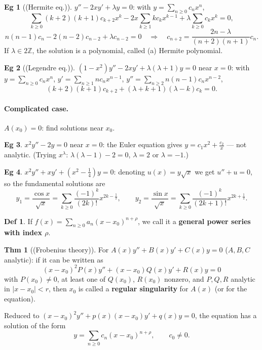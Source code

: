 \documentclass[11pt]{article}
\theoremstyle{definition}
\newtheorem*{definition}{Def}
\newtheorem*{theorem}{Thm}
\newtheorem*{example}{Eg}
\theoremstyle{remark}
\newcommand{\Z}{\mathbb{Z}}
\begin{document}
\begin{example}[(Hermite eq.)]
$y''-2xy'+\lambda y=0$: with $y=\sum_{n\ge0}c_nx^n$,
\[
\sum_{k\ge0}(k+2)(k+1)c_{k+2}x^k-2x\sum_{k\ge1}kc_kx^{k-1}+\lambda\sum_{k\ge0}c_kx^k=0,
\]
\[
n(n-1)c_n-2(n-2)c_{n-2}+\lambda c_{n-2}=0
\quad\Rightarrow\quad c_{n+2}=\frac{2n-\lambda}{(n+2)(n+1)}c_n.
\]
If $\lambda\in2\Z$, the solution is a polynomial, called (a) Hermite polynomial.
\end{example}

\begin{example}[(Legendre eq.)]
$(1-x^2)y''-2xy'+\lambda(\lambda+1)y=0$ near $x=0$: with
$y=\sum_{n\ge0}c_nx^n$, $y'=\sum_{n\ge1}nc_nx^{n-1}$, $y''=\sum_{n\ge2}n(n-1)c_nx^{n-2}$,
\[
(k+2)(k+1)c_{k+2}+(\lambda+k+1)(\lambda-k)c_k=0.
\]
\end{example}

\paragraph{Complicated case.}
$A(x_0)=0$: find solutions near $x_0$.

\begin{example}
$x^2y''-2y=0$ near $x=0$: the Euler equation gives
$y=c_1x^2+\frac{c_2}{x}$ --- not analytic. (Trying $x^\lambda$:
$\lambda(\lambda-1)-2=0$, $\lambda=2$ or $\lambda=-1$.)
\end{example}

\begin{example}
$x^2y''+xy'+(x^2-\frac14)y=0$: denoting $u(x)=y\sqrt{x}$ we get $u''+u=0$, so the fundamental
solutions are
\[
y_1=\frac{\cos x}{\sqrt{x}}=\sum_{k\ge0}\frac{(-1)^k}{(2k)!}x^{2k-\frac12},
\qquad
y_2=\frac{\sin x}{\sqrt{x}}=\sum_{k\ge0}\frac{(-1)^k}{(2k+1)!}x^{2k+\frac12}.
\]
\end{example}

\begin{definition}
If $f(x)=\sum_{n\ge0}a_n(x-x_0)^{n+\rho}$, we call it a \textbf{general power series with index $\rho$}.
\end{definition}

\begin{theorem}[(Frobenius theory)]
For $A(x)y''+B(x)y'+C(x)y=0$ ($A,B,C$ analytic): if it can be written as
\[
(x-x_0)^2P(x)y''+(x-x_0)Q(x)y'+R(x)y=0
\]
with $P(x_0)\neq0$, at least one of $Q(x_0)$, $R(x_0)$ nonzero, and $P,Q,R$ analytic in
$|x-x_0|<r$, then $x_0$ is called a \textbf{regular singularity} for $A(x)$ (or for the equation).

Reduced to $(x-x_0)^2y''+p(x)(x-x_0)y'+q(x)y=0$, the equation has a solution of the form
\[
y=\sum_{n\ge0}c_n(x-x_0)^{n+\rho}, \qquad c_0\neq0.
\]
\end{theorem}
\end{document}
